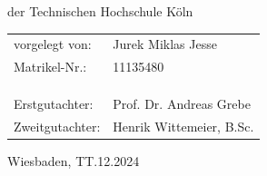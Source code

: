 \begin{titlepage}
    der Technischen Hochschule Köln
    \vfill
    \begin{tabular}{@{}ll}
        vorgelegt von:  & Jurek Miklas Jesse       \\
        Matrikel-Nr.:   & 11135480                 \\
        \\
        \\
        \\
        Erstgutachter:  & Prof. Dr. Andreas Grebe  \\
        Zweitgutachter: & Henrik Wittemeier, B.Sc.
    \end{tabular}
    \vfill
    Wiesbaden, TT.12.2024%
    \rmfamily%
\end{titlepage}